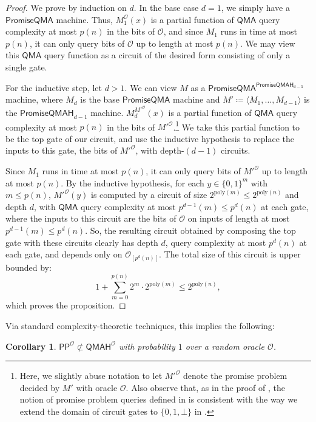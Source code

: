 \documentclass[11pt]{article}%
\newtheorem{corollary}[theorem]{Corollary}
\newcommand{\poly}{\mathrm{poly}}
\begin{document}
\begin{proof}
We prove by induction on $d$. In the base case $d = 1$, we simply have a $\mathsf{PromiseQMA}$ machine. Thus, $M_1^\mathcal{O}(x)$ is a partial function of $\mathsf{QMA}$ query complexity at most $p(n)$ in the bits of $\mathcal{O}$, and since $M_1$ runs in time at most $p(n)$, it can only query bits of $\mathcal{O}$ up to length at most $p(n)$. We may view this $\mathsf{QMA}$ query function as a circuit of the desired form consisting of only a single gate.

For the inductive step, let $d > 1$. We can view $M$ as a $\mathsf{PromiseQMA}^\mathsf{PromiseQMAH_{d-1}}$ machine, where $M_d$ is the base $\mathsf{PromiseQMA}$ machine and $M' \coloneqq \langle M_1,\ldots,M_{d-1} \rangle$ is the $\mathsf{PromiseQMAH}_{d-1}$ machine. $M_d^{M'^{\mathcal{O}}}(x)$ is a partial function of $\mathsf{QMA}$ query complexity at most $p(n)$ in the bits of $M'^{\mathcal{O}}$.\footnote{Here, we slightly abuse notation to let $M'^{\mathcal{O}}$ denote the promise problem decided by $M'$ with oracle $\mathcal{O}$. Also observe that, as in the proof of , the notion of promise problem queries defined in  is consistent with the way we extend the domain of circuit gates to $\{0,1,\bot\}$ in .} We take this partial function to be the top gate of our circuit, and use the inductive hypothesis to replace the inputs to this gate, the bits of $M'^{\mathcal{O}}$, with depth-$(d-1)$ circuits.

Since $M_1$ runs in time at most $p(n)$, it can only query bits of $M'^{\mathcal{O}}$ up to length at most $p(n)$. By the inductive hypothesis, for each $y \in \{0,1\}^{m}$ with $m \le p(n)$, $M'^{\mathcal{O}}(y)$ is computed by a circuit of size $2^{\poly(m)} \le 2^{\poly(n)}$ and depth $d$, with $\mathsf{QMA}$ query complexity at most $p^{d-1}(m) \le p^d(n)$ at each gate, where the inputs to this circuit are the bits of $\mathcal{O}$ on inputs of length at most $p^{d-1}(m) \le p^d(n)$. So, the resulting circuit obtained by composing the top gate with these circuits clearly has depth $d$, query complexity at most $p^d(n)$ at each gate, and depends only on $\mathcal{O}_{[p^d(n)]}$. The total size of this circuit is upper bounded by:
\[
1 + \sum_{m=0}^{p(n)} 2^{m} \cdot 2^{\poly(m)} \le 2^{\poly(n)},
\]
which proves the proposition.
\end{proof}

Via standard complexity-theoretic techniques, this implies the following:
\begin{corollary}
\label{cor:pp_not_in_qmah}
$\mathsf{PP}^\mathcal{O}\not \subset \mathsf{QMAH}^\mathcal{O}$ with probability $1$ over a random oracle $\mathcal{O}$.
\end{corollary}
\end{document}
